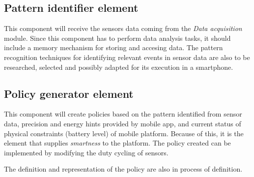 \subsection{Pattern identifier element} 
\label{sub:pattern_identifier_element}
This component will receive the sensors data coming from the \emph{Data acquisition} module.
Since this component has to perform data analysis tasks, it should include a memory mechanism for storing and accesing data.
The pattern recognition techniques for identifying relevant events in sensor data are also to be researched, selected and possibly adapted for its execution in a smartphone.

\subsection{Policy generator element} 
\label{sub:policy_generator_element}
This component will create policies based on the pattern identified from sensor data, precision and energy hints provided by mobile app, and current status of physical constraints (battery level) of mobile platform.
Because of this, it is the element that supplies \emph{smartness} to the platform.
The policy created can be implemented by modifying the duty cycling of sensors.

The definition and representation of the policy are also in process of definition.
